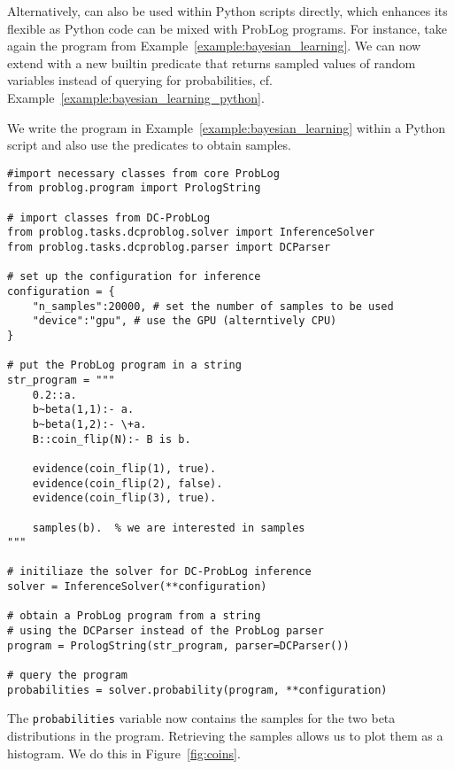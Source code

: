Alternatively, \dcproblogsys can also be used within Python scripts directly, which enhances its flexible as Python code can be mixed with ProbLog programs. For instance, take again the program from Example~\ref{example:bayesian_learning}. We can now extend \dcproblogsys with a new builtin  predicate that returns sampled values of random variables instead of querying for probabilities, cf. Example~\ref{example:bayesian_learning_python}.

\begin{example}
\label{example:bayesian_learning_python}
We write the program in Example~\ref{example:bayesian_learning} within a Python script and also use the  predicates to obtain samples. 

\begin{verbatim}
#import necessary classes from core ProbLog
from problog.program import PrologString

# import classes from DC-ProbLog
from problog.tasks.dcproblog.solver import InferenceSolver
from problog.tasks.dcproblog.parser import DCParser

# set up the configuration for inference
configuration = {
    "n_samples":20000, # set the number of samples to be used
    "device":"gpu", # use the GPU (alterntively CPU)
}

# put the ProbLog program in a string
str_program = """
    0.2::a.
    b~beta(1,1):- a.
    b~beta(1,2):- \+a.
    B::coin_flip(N):- B is b.
    
    evidence(coin_flip(1), true).
    evidence(coin_flip(2), false).
    evidence(coin_flip(3), true).
    
    samples(b).  % we are interested in samples
"""

# initiliaze the solver for DC-ProbLog inference
solver = InferenceSolver(**configuration)

# obtain a ProbLog program from a string 
# using the DCParser instead of the ProbLog parser
program = PrologString(str_program, parser=DCParser())

# query the program
probabilities = solver.probability(program, **configuration)
\end{verbatim}

The \texttt{probabilities} variable now contains the samples for the two beta distributions in the \dcproblogsty program. Retrieving the samples allows us to plot them as a histogram. We do this in Figure~\ref{fig:coins}.
\end{example}











